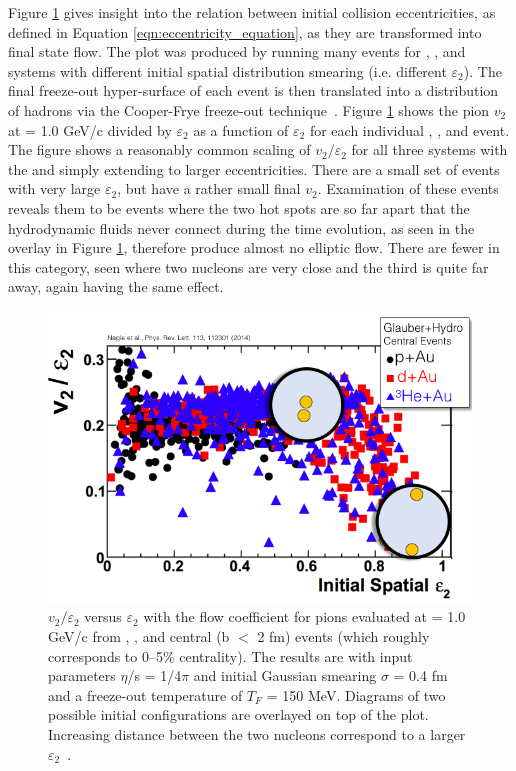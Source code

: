 Figure \ref{fig:v2_epsi2_ampt} gives insight into the relation between initial collision eccentricities, as defined in Equation \ref{eqn:eccentricity_equation}, as they are transformed into final state flow. The plot was produced by running many events for \pau, \dau, and \hau systems with different initial spatial distribution smearing (i.e. different $\varepsilon_2$). The final freeze-out hyper-surface of each event is then translated into a distribution of hadrons via the Cooper-Frye freeze-out technique~\cite{PhysRevD.10.186}. Figure \ref{fig:v2_epsi2_ampt} shows the pion $v_2$ at \pt = 1.0 GeV/c divided by $\varepsilon_2$ as a function of $\varepsilon_2$ for each individual \pau, \dau, and \hau event. The figure shows a reasonably common scaling of $v_2/\varepsilon_2$ for all three systems with the \dau and \hau simply extending to larger eccentricities. There are a small set of events with very large $\varepsilon_2$, but have a rather small final $v_2$. Examination of these events reveals them to be \dau events where the two hot spots are so far apart that the hydrodynamic fluids never connect during the time evolution, as seen in the overlay in Figure \ref{fig:v2_epsi2_ampt}, therefore produce almost no elliptic flow. There are fewer \hau in this category, seen where two nucleons are very close and the third is quite far away, again having the same effect.

\begin{figure}[!ht]
\begin{center}
\includegraphics[width=0.6\linewidth]{figs/v2_e2_ampt.png}
\caption{$v_2/\varepsilon_2$ versus $\varepsilon_2$ with the flow coefficient
for pions evaluated at \pt = 1.0 GeV/c from \pau,
\dau, and \hau central (b $<$ 2 fm) events (which roughly corresponds to 0--5\% centrality). The results
are with input parameters $\eta$/s = 1/4$\pi$ and initial Gaussian
smearing $\sigma$ = 0.4 fm and a freeze-out temperature of $T_F$ = 150
MeV. Diagrams of two possible \dau initial configurations are overlayed on top of the plot. Increasing distance between the two \dau nucleons correspond to a larger $\varepsilon_2$~\cite{PhysRevLett.113.112301}.}
\label{fig:v2_epsi2_ampt}
\end{center}
\end{figure}

